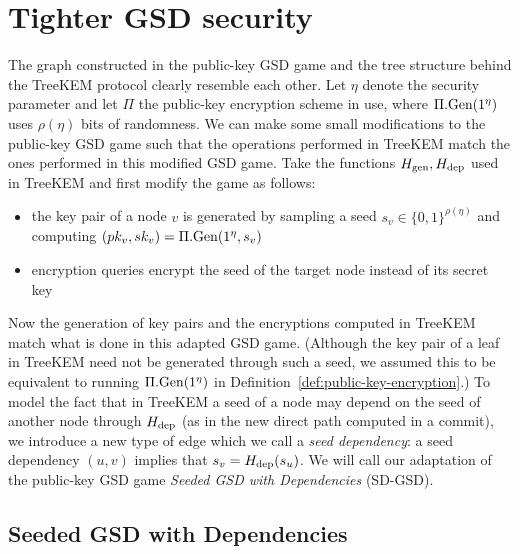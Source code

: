 \section{Tighter GSD security} \label{sec:tighter-gsd-security}

The graph constructed in the public-key GSD game and the tree structure behind the TreeKEM protocol clearly resemble each other. Let $\eta$ denote the security parameter and let $\Pi$ the public-key encryption scheme in use, where $\Pi.\mathrm{Gen}(1^\eta)$ uses $\rho(\eta)$ bits of randomness. We can make some small modifications to the public-key GSD game such that the operations performed in TreeKEM match the ones performed in this modified GSD game. Take the functions $H_\mathrm{gen}, H_\mathrm{dep}$ used in TreeKEM and first modify the game as follows:
\begin{itemize}
	\item the key pair of a node $v$ is generated by sampling a seed $s_v \in \{0, 1\}^{\rho(\eta)}$ and computing $(pk_v, sk_v) = \Pi.\mathrm{Gen}(1^\eta, s_v)$
	\item encryption queries encrypt the seed of the target node instead of its secret key
\end{itemize}
Now the generation of key pairs and the encryptions computed in TreeKEM match what is done in this adapted GSD game. (Although the key pair of a leaf in TreeKEM need not be generated through such a seed, we assumed this to be equivalent to running $\Pi.\mathrm{Gen}(1^\eta)$ in Definition~\ref{def:public-key-encryption}.) To model the fact that in TreeKEM a seed of a node may depend on the seed of another node through $H_\mathrm{dep}$ (as in the new direct path computed in a commit), we introduce a new type of edge which we call a \emph{seed dependency}: a seed dependency $(u, v)$ implies that $s_v = H_\mathrm{dep}(s_u)$. We will call our adaptation of the public-key GSD game \emph{Seeded GSD with Dependencies} (SD-GSD).

\subsection{Seeded GSD with Dependencies}



